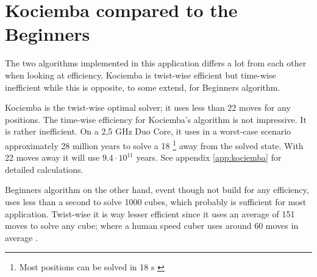 \section{Kociemba compared to the Beginners}
The two algorithms implemented in this application differs a lot from each other when looking at efficiency. 
Kociemba is twist-wise efficient but time-wise inefficient while this is opposite, to some extend, for Beginners algorithm. 

Kociemba is the twist-wise optimal solver; it uses less than 22 moves for any positions. 
The time-wise efficiency for Kociemba's algorithm is not impressive. It is rather inefficient. On a 2,5 GHz Duo Core, it uses in a worst-case scenario approximately 28 million years to solve a \cube{} 18 \twist{}\footnote{Most positions can be solved in 18 \twist{}s \cite{kociemba09}} away from the solved state. With 22 moves away it will use $9.4\cdot{}10^{11}$ years. See appendix \ref{app:kociemba} for detailed calculations.   

Beginners algorithm on the other hand, event though not build for any efficiency, uses less than a second to solve 1000 cubes, which probably is sufficient for most application. 
Twist-wise it is way lesser efficient since it uses an average of 151 moves to solve any cube; where a human speed cuber uses around 60 moves in average \cite{larsPetrus97} \cite{cubeFreak}.
